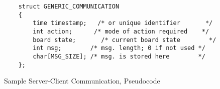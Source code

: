 \documentclass[letterpaper]{article}
\begin{document}

\begin{figure}
    \lstset{keepspaces=true}
    \begin{lstlisting}
    struct GENERIC_COMMUNICATION
    {
        time timestamp;   /* or unique identifier       */
        int action;      /* mode of action required    */
        board state;       /* current board state        */
        int msg;        /* msg. length; 0 if not used */
        char[MSG_SIZE]; /* msg. is stored here        */
    };
    \end{lstlisting}
    \caption{Sample Server-Client Communication, Pseudocode}
    \label{fig:fun_reqs_server_gamestate_struct}
\end{figure}
\end{document}
